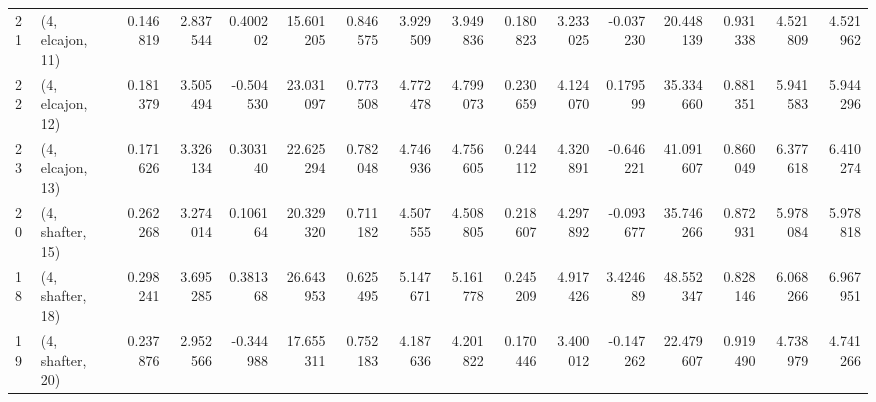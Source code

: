 \begin{tabular}{llrrrrrrrrrrrrrr}
21 &  (4, elcajon, 11) &   0.146819 &  2.837544 &  0.400202 &   15.601205 &  0.846575 &   3.929509 &   3.949836 &  0.180823 &  3.233025 & -0.037230 &   20.448139 &  0.931338 &   4.521809 &   4.521962 \\
22 &  (4, elcajon, 12) &   0.181379 &  3.505494 & -0.504530 &   23.031097 &  0.773508 &   4.772478 &   4.799073 &  0.230659 &  4.124070 &  0.179599 &   35.334660 &  0.881351 &   5.941583 &   5.944296 \\
23 &  (4, elcajon, 13) &   0.171626 &  3.326134 &  0.303140 &   22.625294 &  0.782048 &   4.746936 &   4.756605 &  0.244112 &  4.320891 & -0.646221 &   41.091607 &  0.860049 &   6.377618 &   6.410274 \\
20 &  (4, shafter, 15) &   0.262268 &  3.274014 &  0.106164 &   20.329320 &  0.711182 &   4.507555 &   4.508805 &  0.218607 &  4.297892 & -0.093677 &   35.746266 &  0.872931 &   5.978084 &   5.978818 \\
18 &  (4, shafter, 18) &   0.298241 &  3.695285 &  0.381368 &   26.643953 &  0.625495 &   5.147671 &   5.161778 &  0.245209 &  4.917426 &  3.424689 &   48.552347 &  0.828146 &   6.068266 &   6.967951 \\
19 &  (4, shafter, 20) &   0.237876 &  2.952566 & -0.344988 &   17.655311 &  0.752183 &   4.187636 &   4.201822 &  0.170446 &  3.400012 & -0.147262 &   22.479607 &  0.919490 &   4.738979 &   4.741266 \\
\bottomrule
\end{tabular}
